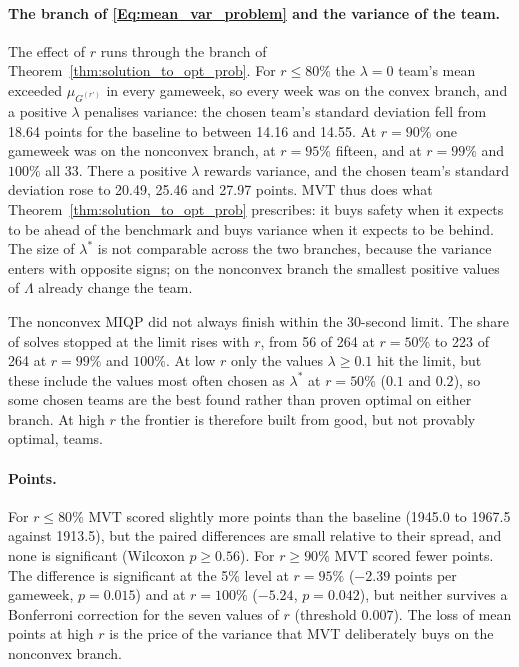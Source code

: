 \documentclass[12pt,oneside,a4paper]{book}
\theoremstyle{definition}
\theoremstyle{remark}
\begin{document}
	\paragraph{The branch of \eqref{Eq:mean_var_problem} and the variance of the team.} The effect of $r$ runs through
	the branch of Theorem~\ref{thm:solution_to_opt_prob}. For $r\le 80\%$ the $\lambda=0$ team's mean exceeded
	$\mu_{G^{(r')}}$ in every gameweek, so every week was on the convex branch, and a positive
	$\lambda$ penalises variance: the chosen team's standard deviation fell from 18.64 points for
	the baseline to between 14.16 and 14.55. At $r=90\%$ one gameweek was on the nonconvex branch,
	at $r=95\%$ fifteen, and at $r=99\%$ and $100\%$ all 33. There a positive $\lambda$ rewards
	variance, and the chosen team's standard deviation rose to 20.49, 25.46 and 27.97 points.
	MVT thus does what Theorem~\ref{thm:solution_to_opt_prob} prescribes: it buys safety when it expects to be ahead of the
	benchmark and buys variance when it expects to be behind. The size of $\lambda^*$ is not
	comparable across the two branches, because the variance enters with opposite signs; on the
	nonconvex branch the smallest positive values of $\Lambda$ already change the team.

	The nonconvex MIQP did not always finish within the 30-second limit. The share of solves
	stopped at the limit rises with $r$, from 56 of 264 at $r=50\%$ to 223 of 264 at $r=99\%$ and
	$100\%$. At low $r$ only the values $\lambda\ge 0.1$ hit the limit, but these include the
	values most often chosen as $\lambda^*$ at $r=50\%$ ($0.1$ and $0.2$), so some chosen teams are
	the best found rather than proven optimal on either branch.
	At high $r$ the frontier is therefore built from good, but not provably optimal, teams.

	\paragraph{Points.} For $r\le 80\%$ MVT scored slightly more points than the baseline (1945.0
	to 1967.5 against 1913.5), but the paired differences are small relative to their spread, and
	none is significant (Wilcoxon $p\ge 0.56$). For $r\ge 90\%$ MVT scored fewer points. The
	difference is significant at the 5\% level at $r=95\%$ ($-2.39$ points per gameweek, $p=0.015$)
	and at $r=100\%$ ($-5.24$, $p=0.042$), but neither survives a Bonferroni correction for the
	seven values of $r$ (threshold $0.007$). The loss of mean points at high $r$ is the price of the
	variance that MVT deliberately buys on the nonconvex branch.
\end{document}
